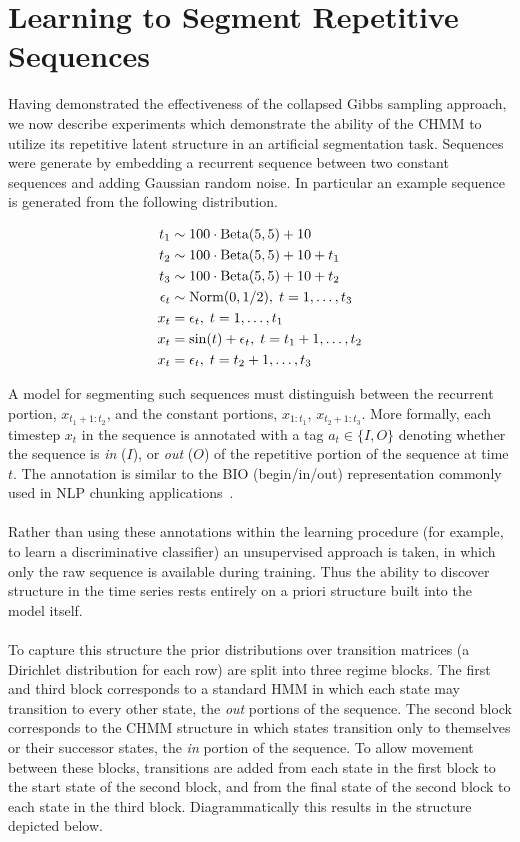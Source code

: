 \documentclass[12pt]{report}
\newcommand{\1}[0]{\mathbbm{1}}
\newcommand{\Beta}[0]{\textnormal{Beta}}
\newcommand{\Norm}[0]{\textnormal{Norm}}
\newcommand{\seq}[3]{\ensuremath{#1_{{#2}:{#3}}}}
\begin{document}
\section{Learning to Segment Repetitive Sequences}
\label{sec:Learning to Segment Repetitive Sequences}
Having demonstrated the effectiveness of the collapsed Gibbs sampling approach,
we now describe experiments which demonstrate the ability of the \ac{CHMM} to utilize its repetitive
latent structure in an artificial segmentation task. Sequences were generate by
embedding a recurrent sequence between two constant sequences and adding Gaussian random noise.
In particular an example sequence is generated from the following distribution.

\begin{align*}
    t_1 & \sim 100 \cdot \Beta(5, 5) + 10 \\
    t_2 & \sim 100 \cdot \Beta(5, 5) + 10 + t_1 \\
    t_3 & \sim 100 \cdot \Beta(5, 5) + 10 + t_2 \\
    \epsilon_t & \sim \Norm(0, 1/2),\; t = 1,\ldots,t_3 \\
    x_t &= \epsilon_t,\; t=1,\ldots,t_1 \\
    x_t &= \sin(t) + \epsilon_t,\; t=t_1+1,\ldots,t_2 \\
    x_t &= \epsilon_t,\; t=t_2 + 1,\ldots,t_3\\
\end{align*}

A model for segmenting such sequences must distinguish between the recurrent portion,
$\seq{x}{t_1+1}{t_2}$, and the constant portions, $\seq{x}{1}{t_1}$, $\seq{x}{t_2+1}{t_3}$.
More formally, each timestep $x_t$ in the sequence is annotated with a tag $a_t \in \{I, O\}$
denoting whether the sequence is \emph{in} ($I$), or \emph{out} ($O$) of the repetitive portion
of the sequence at time $t$. The annotation is similar to the BIO (begin/in/out) representation
commonly used in \ac{NLP} chunking applications~\cite{ramshaw-bio}.
\\\\
Rather than using these annotations within the learning procedure (for example, to learn a
discriminative classifier) an unsupervised approach is taken, in which only the raw sequence
is available during training. Thus the ability to discover structure in the time series rests
entirely on a priori structure built into the model itself.
\\\\
To capture this structure the prior distributions over transition matrices
(a Dirichlet distribution for each row) are split into three regime blocks.
The first and third block corresponds to a standard \ac{HMM}
in which each state may transition to every other state, the \emph{out} portions of the sequence.
The second block corresponds to the \ac{CHMM} structure in which states transition
only to themselves or their successor states, the \emph{in} portion of the sequence.
To allow movement between these blocks, transitions are added from each state in the first block
to the start state of the second block, and from the final state of the second block to each state
in the third block. Diagrammatically this results in the structure depicted below.
\end{document}
